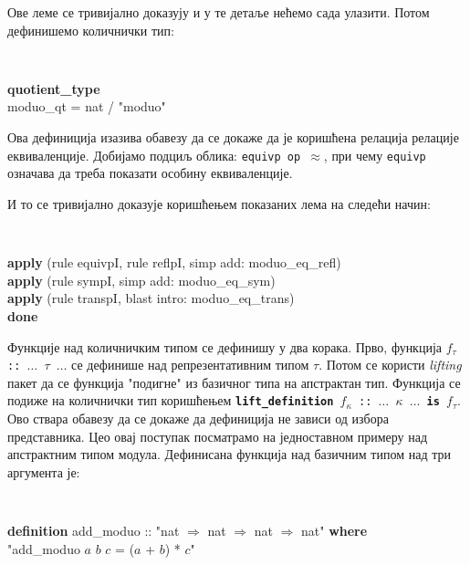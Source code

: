 Ове леме се тривијално доказују и у те детаље нећемо сада
улазити. Потом дефинишемо количнички тип:

\smallskip
{}
\begin{small}
{\tt 
\begin{tabbing}
\textbf{quo}\=\textbf{tient\_type } \\
  \> moduo\_qt = nat / "moduo"
\end{tabbing}
}
\end{small}

Ова дефиниција изазива обавезу да се докаже да је коришћена релација
релације еквиваленције. Добијамо подциљ облика: {\tt equivp op
  $\approx$}, при чему {\tt equivp} означава да треба показати особину
еквиваленције.

И то се тривијално доказује коришћењем показаних лема на следећи начин:

\smallskip
{}
\begin{small}
{\tt 
\begin{tabbing}
\textbf{apply} (rule equivpI, rule reflpI, simp add: moduo\_eq\_refl) \\
\textbf{apply} (rule sympI, simp add: moduo\_eq\_sym) \\
\textbf{apply} (rule transpI, blast intro: moduo\_eq\_trans) \\
\textbf{done}
\end{tabbing}
}
\end{small}


Функције над количничким типом се дефинишу у два корака. Прво,
функција {\tt $f_{\tau}$ :: $\ldots$ $\tau$ $\ldots$} се дефинише над
репрезентативним типом $\tau$. Потом се користи \emph{lifting} пакет
да се функција "подигне" из базичног типа на апстрактан тип.  Функција
се подиже на количнички тип коришћењем {\tt \textbf{lift\_definition}
  $f_{\kappa}$ :: $\ldots$ $\kappa$ $\ldots$ \textbf{is}
  $f_{\tau}$}. Ово ствара обавезу да се докаже да дефиниција не зависи
од избора представника. Цео овај поступак посматрамо на једноставном
примеру над апстрактним типом модула. Дефинисана функција над базичним
типом над три аргумента је:

\smallskip
{}
\begin{small}
{\tt 
\begin{tabbing}
\textbf{def}\=\textbf{inition} add\_moduo :: "nat $\Rightarrow$ nat $\Rightarrow$ nat $\Rightarrow$ nat" \textbf{where } \\
  \> "add\_moduo $a$ $b$ $c$ = ($a$ + $b$) * $c$"
\end{tabbing}
}
\end{small}

